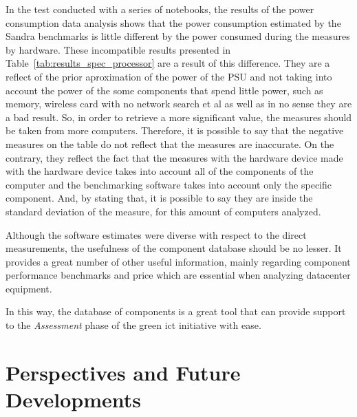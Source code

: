     In the test conducted with a series of notebooks, the results of the power consumption data analysis shows that the power consumption estimated by the Sandra benchmarks is little different by the power consumed during the measures by hardware. These incompatible results presented in Table~\ref{tab:results_spec_processor} are a result of this difference. They are a reflect of the prior aproximation of the power of the PSU and not taking into account the power of the some components that spend little power, such as memory, wireless card with no network search et al as well as in no sense they are a bad result. So, in order to retrieve a more significant value, the measures should be taken from more computers. Therefore, it is possible to say that the negative measures on the table do not reflect that the measures are inaccurate. On the contrary, they reflect the fact that the measures with the hardware device made with the hardware device takes into account all of the components of the computer and the benchmarking software takes into account only the specific component. And, by stating that, it is possible to say they are inside the standard deviation of the measure, for this amount of computers analyzed.
    
    Although the software estimates were diverse with respect to the direct measurements, the usefulness of the component database should be no lesser. It provides a great number of other useful information, mainly regarding component performance benchmarks and price which are essential when analyzing datacenter equipment. 
    
    In this way, the database of components is a great tool that can provide support to the \emph{Assessment} phase of the green ict initiative with ease.
    
    \pagebreak
    \section{Perspectives and Future Developments}

